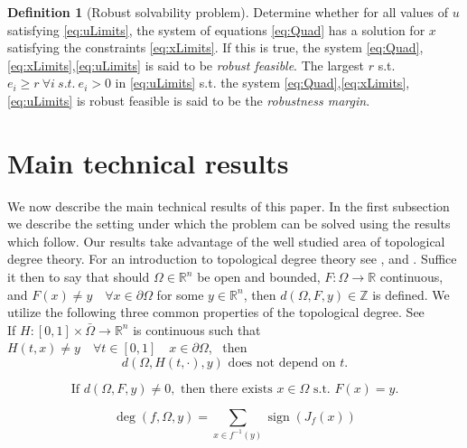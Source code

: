 \documentclass[11pt]{article}
\theoremstyle{plain}
\theoremstyle{definition}
\newtheorem{cdef}{Definition}[section]
\theoremstyle{remark}
\begin{document}
\begin{cdef}[Robust solvability problem]
\label{RobustDef}
Determine whether for all values of $u$ satisfying \eqref{eq:uLimits}, the system of equations \eqref{eq:Quad} has a solution for $x$ satisfying the constraints \eqref{eq:xLimits}. If this is true, the system \eqref{eq:Quad},\eqref{eq:xLimits},\eqref{eq:uLimits} is said to be \emph{robust feasible}. The largest $r$ s.t. $e_i\geq r \ \forall i \ s.t. \ e_i>0$ in \eqref{eq:uLimits} s.t. the system \eqref{eq:Quad},\eqref{eq:xLimits},\eqref{eq:uLimits} is robust feasible is said to be the \emph{robustness margin}.
\end{cdef}

\section{Main technical results}
We now describe the main technical results of this paper. In the first subsection we describe the setting under which the problem can be solved using the results which follow. Our results take advantage of the well studied area of topological degree theory. For an introduction to topological degree theory see \cite{OrChCh2006}, \cite{fonseca1995degree} and \cite{MoVrYa2002}. Suffice it then to say that should $\Omega\in\mathbb{R}^{n}$ be open and bounded, $F:\Omega\rightarrow \mathbb{R}$ continuous, and $F(x)\neq y \quad \forall x\in\partial\Omega$ for some $y\in\mathbb{R}^n$, then $d\left(\Omega,F,y\right)\in\mathbb{Z}$ is defined. 
We utilize the following three common properties of the topological degree. See \cite{OrChCh2006} \\

If $H : [0,1]\times\bar{\Omega}\rightarrow\mathbb{R}^n$ is continuous such that $H(t,x)\neq y \quad \forall t\in[0,1]\quad x\in\partial\Omega$,   \ then 
\begin{equation}\label{eq:Deg1} 
d\left(\Omega,H(t,\cdot),y\right)\text{ does not depend on }t.
\end{equation}

\begin{equation}\label{eq:Deg2}
\text{If }d(\Omega,F,y)\neq 0,\text{ then there exists }x\in\Omega\text{ s.t. }F(x)=y. 
\end{equation}

\begin{equation}\label{eq:Deg3}
\operatorname{deg}\left(f,\Omega,y\right)=\sum\limits_{x\in f^{-1}(y)}\operatorname{sign}\left(J_f(x)\right)
\end{equation}
\end{document}
